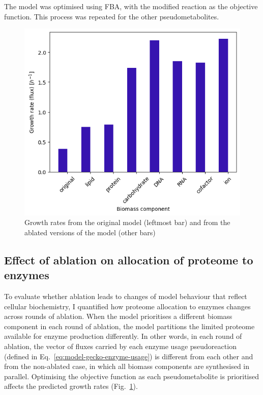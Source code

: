 The model was optimised using FBA, with the modified reaction as the objective function.
This process was repeated for the other pseudometabolites.

\begin{figure}
  \centering
  \includegraphics[width=.6\linewidth]{ablation_example_fluxes.png}
  \caption[
    Growth rates from the original model and from the ablated versions of the model
  ]{
    Growth rates from the original model (leftmost bar) and from the ablated versions of the model (other bars)
  }
  \label{fig:model-ablate-fluxes}
\end{figure}


\subsection{Effect of ablation on allocation of proteome to enzymes}
\label{sec:model-yeast8-pseudometabolites-allocation}

To evaluate whether ablation leads to changes of model behaviour that reflect cellular biochemistry, I quantified how proteome allocation to enzymes changes across rounds of ablation.
When the model prioritises a different biomass component in each round of ablation, the model partitions the limited proteome available for enzyme production differently.
In other words, in each round of ablation, the vector of fluxes carried by each enzyme usage pseudoreaction (defined in Eq.\ \ref{eq:model-gecko-enzyme-usage}) is different from each other and from the non-ablated case, in which all biomass components are synthesised in parallel.
Optimising the objective function as each pseudometabolite is prioritised affects the predicted growth rates (Fig.\ \ref{fig:model-ablate-fluxes}).

